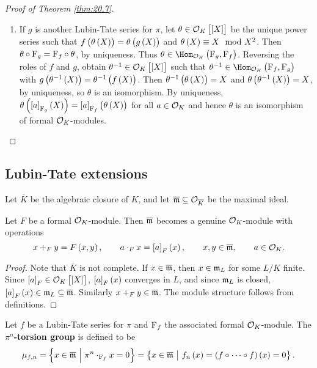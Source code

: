 \begin{proof}[Proof of Theorem \ref{thm:20.7}]
\begin{enumerate}
\item If $ g $ is another Lubin-Tate series for $ \pi $, let $ \theta \in \OOO_K\sbr{\sbr{X}} $ be the unique power series such that $ f\br{\theta\br{X}} = \theta\br{g\br{X}} $ and $ \theta\br{X} \equiv X \mod X^2 $. Then $ \theta \circ \mathrm{F}_g = \mathrm{F}_f \circ \theta $, by uniqueness. Thus $ \theta \in \Hom_{\OOO_K}\br{\F_g, \F_f} $. Reversing the roles of $ f $ and $ g $, obtain $ \theta^{-1} \in \OOO_K\sbr{\sbr{X}} $ such that $ \theta^{-1} \in \Hom_{\OOO_K}\br{\F_f, \F_g} $ with $ g\br{\theta^{-1}\br{X}} = \theta^{-1}\br{f\br{X}} $. Then $ \theta^{-1}\br{\theta\br{X}} = X $ and $ \theta\br{\theta^{-1}\br{X}} = X $, by uniqueness, so $ \theta $ is an isomorphism. By uniqueness, $ \theta\br{\sbr{a}_{\F_g}\br{X}} = \sbr{a}_{\F_f}\br{\theta\br{X}} $ for all $ a \in \mathcal{O}_K $ and hence $ \theta $ is an isomorphism of formal $ \mathcal{O}_K $-modules.
\end{enumerate}
\end{proof}

\pagebreak

\subsection{Lubin-Tate extensions}

Let $ \overline{K} $ be the algebraic closure of $ K $, and let $ \overline{\mathfrak{m}} \subseteq \mathcal{O}_{\overline{K}} $ be the maximal ideal.

\begin{lemma}
Let $ F $ be a formal $ \mathcal{O}_K $-module. Then $ \overline{\mathfrak{m}} $ becomes a genuine $ \mathcal{O}_K $-module with operations
$$ x +_F y = F\br{x, y}, \qquad a \cdot_F x = \sbr{a}_F\br{x}, \qquad x, y \in \overline{\mmm}, \qquad a \in \OOO_K. $$
\end{lemma}

\begin{proof}
Note that $ \overline{K} $ is not complete. If $ x \in \overline{\mathfrak{m}} $, then $ x \in \mathfrak{m}_L $ for some $ L / K $ finite. Since $ \sbr{a}_F \in \OOO_K\sbr{\sbr{X}} $, $ \sbr{a}_F\br{x} $ converges in $ L $, and since $ \mathfrak{m}_L $ is closed, $ \sbr{a}_F\br{x} \in \mmm_L \subseteq \overline{\mmm} $. Similarly $ x +_F y \in \overline{\mathfrak{m}} $. The module structure follows from definitions.
\end{proof}

\begin{definition}
Let $ f $ be a Lubin-Tate series for $ \pi $ and $ \mathrm{F}_f $ the associated formal $ \mathcal{O}_K $-module. The \textbf{$ \pi^n $-torsion group} is defined to be
$$ \mu_{f, n} = \cbr{x \in \overline{\mmm} \st \pi^n \cdot_{\F_f} x = 0} = \cbr{x \in \overline{\mmm} \st f_n\br{x} = \br{f \circ \dots \circ f}\br{x} = 0}. $$
\end{definition}

